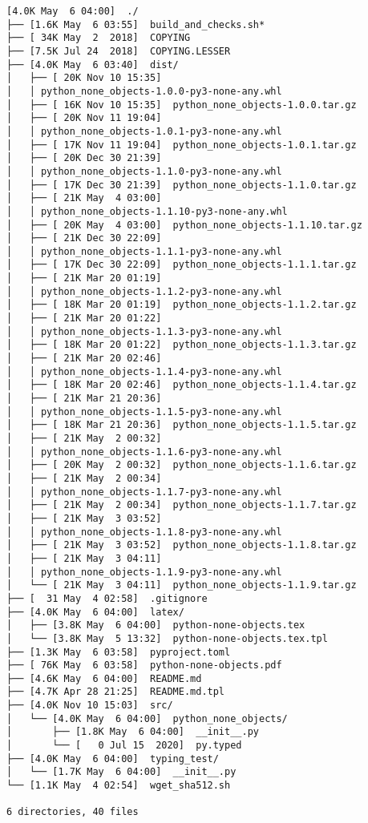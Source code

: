 \documentclass{article}
\begin{document}
\begin{verbatim}
[4.0K May  6 04:00]  ./
├── [1.6K May  6 03:55]  build_and_checks.sh*
├── [ 34K May  2  2018]  COPYING
├── [7.5K Jul 24  2018]  COPYING.LESSER
├── [4.0K May  6 03:40]  dist/
│   ├── [ 20K Nov 10 15:35]
│   │ python_none_objects-1.0.0-py3-none-any.whl
│   ├── [ 16K Nov 10 15:35]  python_none_objects-1.0.0.tar.gz
│   ├── [ 20K Nov 11 19:04]
│   │ python_none_objects-1.0.1-py3-none-any.whl
│   ├── [ 17K Nov 11 19:04]  python_none_objects-1.0.1.tar.gz
│   ├── [ 20K Dec 30 21:39]
│   │ python_none_objects-1.1.0-py3-none-any.whl
│   ├── [ 17K Dec 30 21:39]  python_none_objects-1.1.0.tar.gz
│   ├── [ 21K May  4 03:00]
│   │ python_none_objects-1.1.10-py3-none-any.whl
│   ├── [ 20K May  4 03:00]  python_none_objects-1.1.10.tar.gz
│   ├── [ 21K Dec 30 22:09]
│   │ python_none_objects-1.1.1-py3-none-any.whl
│   ├── [ 17K Dec 30 22:09]  python_none_objects-1.1.1.tar.gz
│   ├── [ 21K Mar 20 01:19]
│   │ python_none_objects-1.1.2-py3-none-any.whl
│   ├── [ 18K Mar 20 01:19]  python_none_objects-1.1.2.tar.gz
│   ├── [ 21K Mar 20 01:22]
│   │ python_none_objects-1.1.3-py3-none-any.whl
│   ├── [ 18K Mar 20 01:22]  python_none_objects-1.1.3.tar.gz
│   ├── [ 21K Mar 20 02:46]
│   │ python_none_objects-1.1.4-py3-none-any.whl
│   ├── [ 18K Mar 20 02:46]  python_none_objects-1.1.4.tar.gz
│   ├── [ 21K Mar 21 20:36]
│   │ python_none_objects-1.1.5-py3-none-any.whl
│   ├── [ 18K Mar 21 20:36]  python_none_objects-1.1.5.tar.gz
│   ├── [ 21K May  2 00:32]
│   │ python_none_objects-1.1.6-py3-none-any.whl
│   ├── [ 20K May  2 00:32]  python_none_objects-1.1.6.tar.gz
│   ├── [ 21K May  2 00:34]
│   │ python_none_objects-1.1.7-py3-none-any.whl
│   ├── [ 21K May  2 00:34]  python_none_objects-1.1.7.tar.gz
│   ├── [ 21K May  3 03:52]
│   │ python_none_objects-1.1.8-py3-none-any.whl
│   ├── [ 21K May  3 03:52]  python_none_objects-1.1.8.tar.gz
│   ├── [ 21K May  3 04:11]
│   │ python_none_objects-1.1.9-py3-none-any.whl
│   └── [ 21K May  3 04:11]  python_none_objects-1.1.9.tar.gz
├── [  31 May  4 02:58]  .gitignore
├── [4.0K May  6 04:00]  latex/
│   ├── [3.8K May  6 04:00]  python-none-objects.tex
│   └── [3.8K May  5 13:32]  python-none-objects.tex.tpl
├── [1.3K May  6 03:58]  pyproject.toml
├── [ 76K May  6 03:58]  python-none-objects.pdf
├── [4.6K May  6 04:00]  README.md
├── [4.7K Apr 28 21:25]  README.md.tpl
├── [4.0K Nov 10 15:03]  src/
│   └── [4.0K May  6 04:00]  python_none_objects/
│       ├── [1.8K May  6 04:00]  __init__.py
│       └── [   0 Jul 15  2020]  py.typed
├── [4.0K May  6 04:00]  typing_test/
│   └── [1.7K May  6 04:00]  __init__.py
└── [1.1K May  4 02:54]  wget_sha512.sh

6 directories, 40 files
\end{verbatim}
\end{document}

